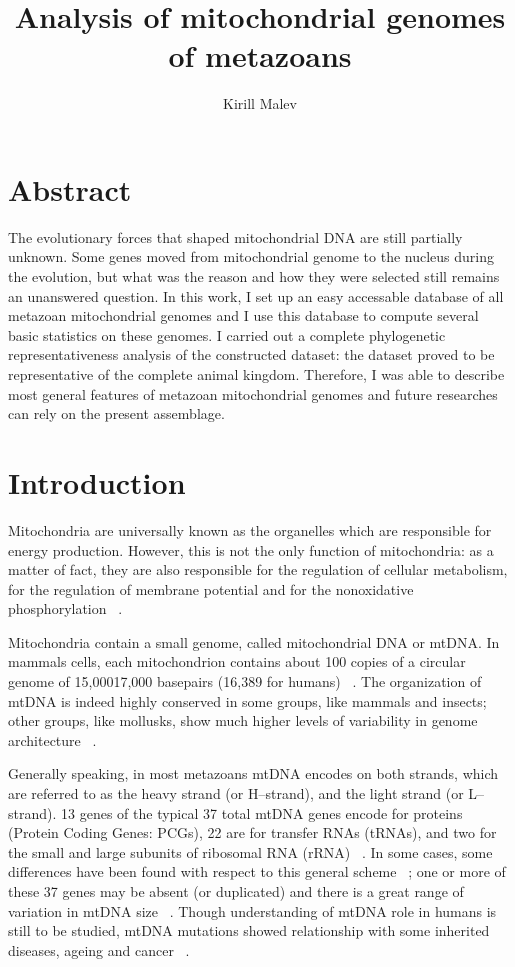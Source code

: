 \documentclass[a4paper,11pt]{article}
\title{Analysis of mitochondrial genomes of metazoans}
\author{Kirill Malev}
\begin{document}
\makecoverpage

\clearpage
\tableofcontents
\clearpage

\section{Abstract}
The evolutionary forces that shaped mitochondrial DNA are still partially unknown.
Some genes moved from mitochondrial genome to the nucleus during the evolution, but 
what was the reason and how they were selected still remains an unanswered question. 
In this work, I set up an easy accessable database of all metazoan mitochondrial genomes 
and I use this database to compute several basic statistics on these genomes. I carried 
out a complete phylogenetic representativeness analysis of the constructed dataset: the 
dataset proved to be representative of the complete animal kingdom. Therefore, I was able 
to describe most general features of metazoan mitochondrial genomes and future researches 
can rely on the present assemblage.
\clearpage

\section{Introduction}\label{sect:intro}
Mitochondria are universally known as the organelles which are responsible for energy 
production. However, this is not the only function of mitochondria: as a matter of fact, 
they are also responsible for the regulation of cellular metabolism, for the regulation of
membrane potential and for the non­oxidative phosphorylation ~\cite{voet1999fundamentals}.

Mitochondria contain a small genome, called mitochondrial DNA or mtDNA. In
mammals cells, each mitochondrion contains about 100 copies of a circular genome of
15,000­17,000 base­pairs (16,389 for humans) ~\cite{breton2014resourceful}. The organization of mtDNA is
indeed highly conserved in some groups, like mammals and insects; other groups, like
mollusks, show much higher levels of variability in genome architecture ~\cite{iborra2004functional, boore1999animal}.

Generally speaking, in most metazoans mtDNA encodes on both strands, which are
referred to as the heavy strand (or H­--strand), and the light strand (or L­--strand). 13
genes of the typical 37 total mtDNA genes encode for proteins (Protein Coding Genes:
PCGs), 22 are for transfer RNAs (tRNAs), and two for the small and large subunits of
ribosomal RNA (rRNA) ~\cite{iborra2004functional}. In some cases, some differences have been found with
respect to this general scheme ~\cite{valles2006lophotrochozoan}; one or more of these 37 genes may be absent (or
duplicated) and there is a great range of variation in mtDNA size ~\cite{taylor2005mitochondrial}. Though
understanding of mtDNA role in humans is still to be studied, mtDNA mutations showed
relationship with some inherited diseases, ageing and cancer ~\cite{gissi2008evolution}.
\end{document}
